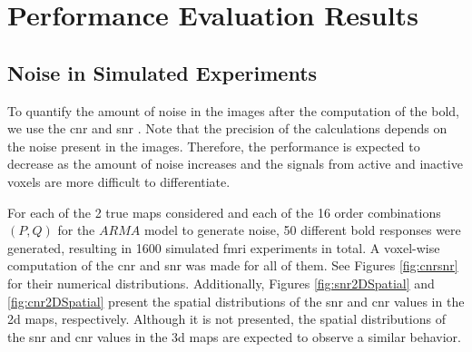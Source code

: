 \chapter{Performance Evaluation Results}

\section{Noise in Simulated Experiments}

To quantify the amount of noise in the images after the computation of the \gls{bold}, we use the \gls{cnr} and \gls{snr} \cite{welvaert2013definition}. Note that the precision of the calculations depends on the noise present in the images. Therefore, the performance is expected to decrease as the amount of noise increases and the signals from active and inactive voxels are more difficult to differentiate.

For each of the 2 true maps considered and each of the 16 order combinations $(P,Q)$ for the $ARMA$ model to generate noise, 50 different \gls{bold} responses were generated, resulting in 1600 simulated \gls{fmri} experiments in total. A voxel-wise computation of the \gls{cnr} and \gls{snr} was made for all of them. See Figures \ref{fig:cnrsnr} for their numerical distributions. Additionally, Figures \ref{fig:snr2DSpatial} and \ref{fig:cnr2DSpatial} present the spatial distributions of the \gls{snr} and \gls{cnr} values in the \gls{2d} maps, respectively. Although it is not presented, the spatial distributions of the \gls{snr} and \gls{cnr} values in the \gls{3d} maps are expected to observe a similar behavior.

